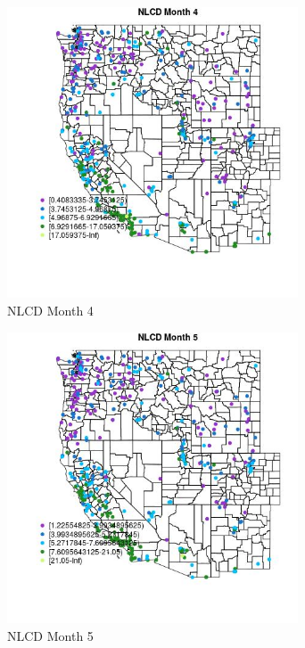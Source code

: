 \begin{figure} 
\centering  
\includegraphics[width=0.77\textwidth]{Code_Outputs/ML_input_report_ML_input_PM25_Step5_part_d_de_duplicated_aves_ML_input_MapObsMo4NLCD.jpg} 
\caption{\label{fig:ML_input_report_ML_input_PM25_Step5_part_d_de_duplicated_aves_ML_inputMapObsMo4NLCD}NLCD Month 4} 
\end{figure} 
 

\begin{figure} 
\centering  
\includegraphics[width=0.77\textwidth]{Code_Outputs/ML_input_report_ML_input_PM25_Step5_part_d_de_duplicated_aves_ML_input_MapObsMo5NLCD.jpg} 
\caption{\label{fig:ML_input_report_ML_input_PM25_Step5_part_d_de_duplicated_aves_ML_inputMapObsMo5NLCD}NLCD Month 5} 
\end{figure} 
 

